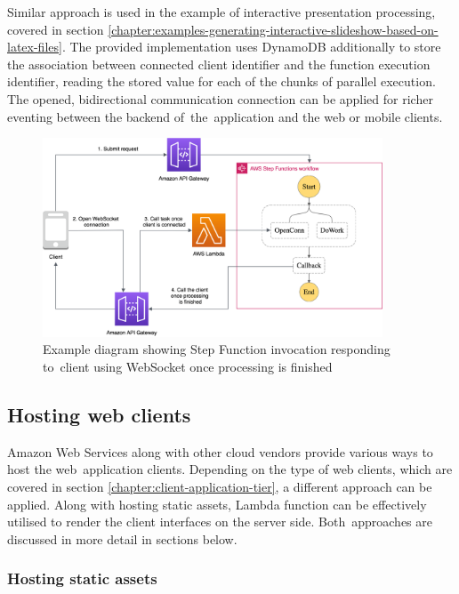 Similar approach is used in the example of interactive presentation processing, covered in section \ref{chapter:examples-generating-interactive-slideshow-based-on-latex-files}.
The provided implementation uses DynamoDB additionally to store the association between connected client identifier and the function execution identifier, reading the stored value for each of the chunks of parallel execution.
The opened, bidirectional communication connection can be applied for richer eventing between the backend of~the~application and the web or mobile clients.

\begin{figure}[H]
   \centering
   \includegraphics[width=0.9\textwidth]{assets/04-serverless-for-web-apps/asyncStepFunction.png}
   \caption{Example diagram showing Step Function invocation responding to~client using WebSocket once processing is finished}
   \label{fig:pattern-async-step-function}
\end{figure}

\subsection{Hosting web clients}

Amazon Web Services along with other cloud vendors provide various ways to host the web~application clients.
Depending on the type of web clients, which are covered in section \ref{chapter:client-application-tier}, a different approach can be applied.
Along with hosting static assets, Lambda function can be effectively utilised to render the client interfaces on the server side.
Both~approaches are discussed in more detail in sections below.

\subsubsection{Hosting static assets}

